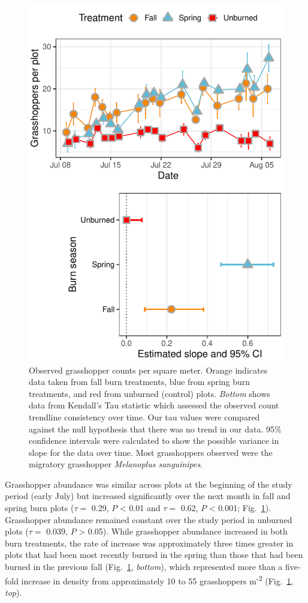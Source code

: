 \documentclass[referee, 
	            sn-basic]
           {sn-jnl}
\begin{document}
\begin{figure}
\centering
\includegraphics{tau_gg-1.pdf}
\caption{Observed grasshopper counts per square meter. 
Orange indicates data taken from fall burn treatments, blue from spring burn treatments, and red from unburned (control) plots.
\emph{Bottom} shows data from Kendall's Tau statistic which assessed the observed count trendline consistency over time. 
Our tau values were compared against the null hypothesis that there was no trend in our data. 
95\% confidence intervals were calculated to show the possible variance in slope for the data over time. 
Most grasshoppers observed were the migratory grasshopper \emph{Melanoplus sanguinipes}.}
\label{tau} %
\end{figure}

Grasshopper abundance was similar across plots at the beginning of the study period (early July) but increased significantly over the next month in fall and spring burn plots (\(\tau =\) 0.29, \(P\) \textless{} 0.01 and \(\tau =\) 0.62, \(P\) \textless{} 0.001; Fig.~\ref{tau}). 
Grasshopper abundance remained constant over the study period in unburned plots (\(\tau =\) 0.039, \(P\) \textgreater{} 0.05). 
While grasshopper abundance increased in both burn treatments, the rate of increase was approximately three times greater in plots that had been most recently burned in the spring than those that had been burned in the previous fall (Fig.~\ref{tau}, \emph{bottom}), which represented more than a five-fold increase in density from approximately 10 to 55 grasshoppers m\textsuperscript{-2} (Fig.~\ref{tau}, \emph{top}).
\end{document}
